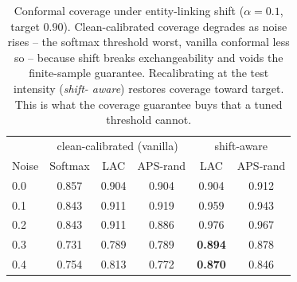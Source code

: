 \begin{table}[t]
\centering
\caption{Conformal coverage under entity-linking shift ($\alpha{=}0.1$, target
$0.90$). Clean-calibrated coverage degrades as noise rises -- the softmax threshold
worst, vanilla conformal less so -- because shift breaks exchangeability and voids
the finite-sample guarantee. Recalibrating at the test intensity (\emph{shift-
aware}) restores coverage toward target. This is what the coverage guarantee buys
that a tuned threshold cannot.}
\label{tab:coverage-shift}
\begin{tabular}{lccc|cc}
\toprule
\multicolumn{1}{c}{} & \multicolumn{3}{c|}{clean-calibrated (vanilla)} & \multicolumn{2}{c}{shift-aware} \\
Noise & Softmax & LAC & APS-rand & LAC & APS-rand \\
\midrule
0.0 & 0.857 & 0.904 & 0.904 & 0.904 & 0.912 \\
0.1 & 0.843 & 0.911 & 0.919 & 0.959 & 0.943 \\
0.2 & 0.843 & 0.911 & 0.886 & 0.976 & 0.967 \\
0.3 & 0.731 & 0.789 & 0.789 & \textbf{0.894} & 0.878 \\
0.4 & 0.754 & 0.813 & 0.772 & \textbf{0.870} & 0.846 \\
\bottomrule
\end{tabular}
\end{table}
